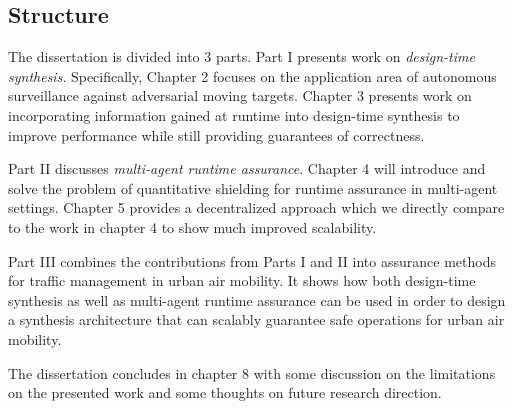 \subsection{Structure}

The dissertation is divided into 3 parts. Part I presents work on \emph{design-time synthesis}. Specifically, Chapter 2 focuses on the application area of autonomous surveillance against adversarial moving targets. Chapter 3 presents work on incorporating information gained at runtime into design-time synthesis to improve performance while still providing guarantees of correctness. 

Part II discusses \emph{multi-agent runtime assurance}. Chapter 4 will introduce and solve the problem of quantitative shielding for runtime assurance in multi-agent settings. Chapter 5 provides a decentralized approach which we directly compare to the work in chapter 4 to show much improved scalability. 

Part III combines the contributions from Parts I and II into assurance methods for traffic management in urban air mobility. It shows how both design-time synthesis as well as multi-agent runtime assurance can be used in order to design a synthesis architecture that can scalably guarantee safe operations for urban air mobility. 

The dissertation concludes in chapter 8 with some discussion on the limitations on the presented work and some thoughts on future research direction. 



